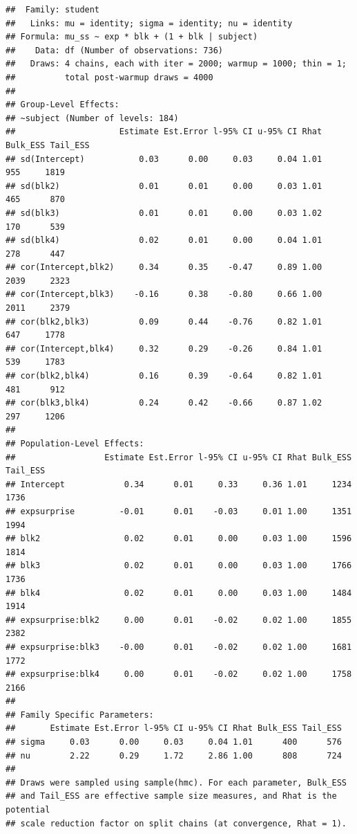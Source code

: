 \documentclass[
]{article}
\begin{document}
\begin{verbatim}
##  Family: student 
##   Links: mu = identity; sigma = identity; nu = identity 
## Formula: mu_ss ~ exp * blk + (1 + blk | subject) 
##    Data: df (Number of observations: 736) 
##   Draws: 4 chains, each with iter = 2000; warmup = 1000; thin = 1;
##          total post-warmup draws = 4000
## 
## Group-Level Effects: 
## ~subject (Number of levels: 184) 
##                     Estimate Est.Error l-95% CI u-95% CI Rhat Bulk_ESS Tail_ESS
## sd(Intercept)           0.03      0.00     0.03     0.04 1.01      955     1819
## sd(blk2)                0.01      0.01     0.00     0.03 1.01      465      870
## sd(blk3)                0.01      0.01     0.00     0.03 1.02      170      539
## sd(blk4)                0.02      0.01     0.00     0.04 1.01      278      447
## cor(Intercept,blk2)     0.34      0.35    -0.47     0.89 1.00     2039     2323
## cor(Intercept,blk3)    -0.16      0.38    -0.80     0.66 1.00     2011     2379
## cor(blk2,blk3)          0.09      0.44    -0.76     0.82 1.01      647     1778
## cor(Intercept,blk4)     0.32      0.29    -0.26     0.84 1.01      539     1783
## cor(blk2,blk4)          0.16      0.39    -0.64     0.82 1.01      481      912
## cor(blk3,blk4)          0.24      0.42    -0.66     0.87 1.02      297     1206
## 
## Population-Level Effects: 
##                  Estimate Est.Error l-95% CI u-95% CI Rhat Bulk_ESS Tail_ESS
## Intercept            0.34      0.01     0.33     0.36 1.01     1234     1736
## expsurprise         -0.01      0.01    -0.03     0.01 1.00     1351     1994
## blk2                 0.02      0.01     0.00     0.03 1.00     1596     1814
## blk3                 0.02      0.01     0.00     0.03 1.00     1766     1736
## blk4                 0.02      0.01     0.00     0.03 1.00     1484     1914
## expsurprise:blk2     0.00      0.01    -0.02     0.02 1.00     1855     2382
## expsurprise:blk3    -0.00      0.01    -0.02     0.02 1.00     1681     1772
## expsurprise:blk4     0.00      0.01    -0.02     0.02 1.00     1758     2166
## 
## Family Specific Parameters: 
##       Estimate Est.Error l-95% CI u-95% CI Rhat Bulk_ESS Tail_ESS
## sigma     0.03      0.00     0.03     0.04 1.01      400      576
## nu        2.22      0.29     1.72     2.86 1.00      808      724
## 
## Draws were sampled using sample(hmc). For each parameter, Bulk_ESS
## and Tail_ESS are effective sample size measures, and Rhat is the potential
## scale reduction factor on split chains (at convergence, Rhat = 1).
\end{verbatim}
\end{document}
